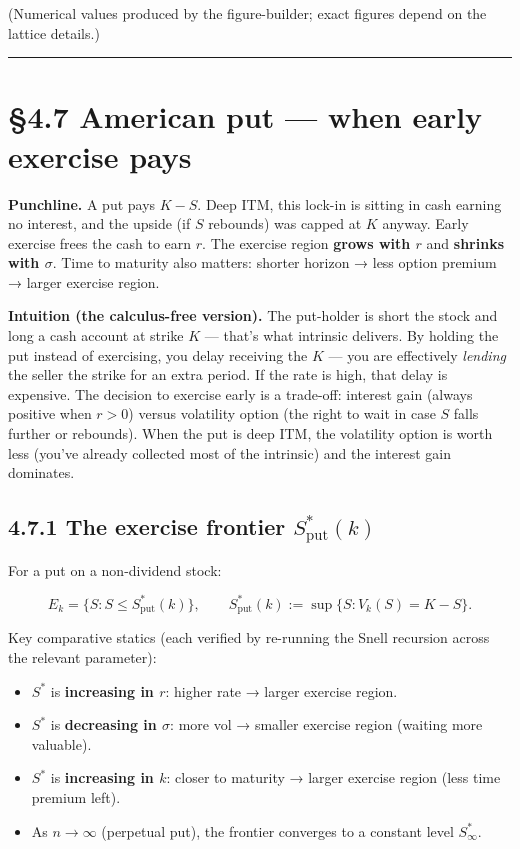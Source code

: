 \documentclass[
  10pt,
  twoside]{book}
\providecommand{\tightlist}{%
  \setlength{\itemsep}{0pt}\setlength{\parskip}{0pt}}
\begin{document}
(Numerical values produced by the figure-builder; exact figures depend
on the lattice details.)

\begin{center}\rule{0.5\linewidth}{0.5pt}\end{center}

\section{§4.7 American put --- when early exercise
pays}\label{american-put-when-early-exercise-pays}

\textbf{Punchline.} A put pays \(K - S\). Deep ITM, this lock-in is
sitting in cash earning no interest, and the upside (if \(S\) rebounds)
was capped at \(K\) anyway. Early exercise frees the cash to earn \(r\).
The exercise region \textbf{grows with \(r\)} and \textbf{shrinks with
\(\sigma\)}. Time to maturity also matters: shorter horizon → less
option premium → larger exercise region.

\textbf{Intuition (the calculus-free version).} The put-holder is short
the stock and long a cash account at strike \(K\) --- that's what
intrinsic delivers. By holding the put instead of exercising, you delay
receiving the \(K\) --- you are effectively \emph{lending} the seller
the strike for an extra period. If the rate is high, that delay is
expensive. The decision to exercise early is a trade-off: interest gain
(always positive when \(r > 0\)) versus volatility option (the right to
wait in case \(S\) falls further or rebounds). When the put is deep ITM,
the volatility option is worth less (you've already collected most of
the intrinsic) and the interest gain dominates.

\subsection{\texorpdfstring{4.7.1 The exercise frontier
\(S^*_{\text{put}}(k)\)}{4.7.1 The exercise frontier S\^{}*\_\{\textbackslash text\{put\}\}(k)}}\label{the-exercise-frontier-s_textputk}

For a put on a non-dividend stock:

\[E_k = \{S : S \le S^*_{\text{put}}(k)\}, \qquad S^*_{\text{put}}(k) := \sup\{S : V_k(S) = K - S\}.\]

Key comparative statics (each verified by re-running the Snell recursion
across the relevant parameter):

\begin{itemize}
\tightlist
\item
  \(S^*\) is \textbf{increasing in \(r\)}: higher rate → larger exercise
  region.
\item
  \(S^*\) is \textbf{decreasing in \(\sigma\)}: more vol → smaller
  exercise region (waiting more valuable).
\item
  \(S^*\) is \textbf{increasing in \(k\)}: closer to maturity → larger
  exercise region (less time premium left).
\item
  As \(n \to \infty\) (perpetual put), the frontier converges to a
  constant level \(S^*_\infty\).
\end{itemize}
\end{document}
